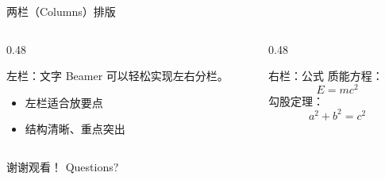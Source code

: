 \documentclass[aspectratio=169]{ctexbeamer}
\begin{document}
\begin{frame}{两栏（Columns）排版}
  \begin{columns}[T]
    \begin{column}{0.48\textwidth}
      \begin{block}{左栏：文字}
        Beamer 可以轻松实现左右分栏。
        \begin{itemize}
          \item 左栏适合放要点
          \item 结构清晰、重点突出
        \end{itemize}
      \end{block}
    \end{column}
    \begin{column}{0.48\textwidth}
      \begin{block}{右栏：公式}
        质能方程：\[ E = mc^2 \]
        勾股定理：\[ a^2 + b^2 = c^2 \]
      \end{block}
    \end{column}
  \end{columns}
\end{frame}

\begin{frame}
  \centering
  {\Huge 谢谢观看！}
  \vspace{1em}
  {\Large Questions?}
\end{frame}
\end{document}
